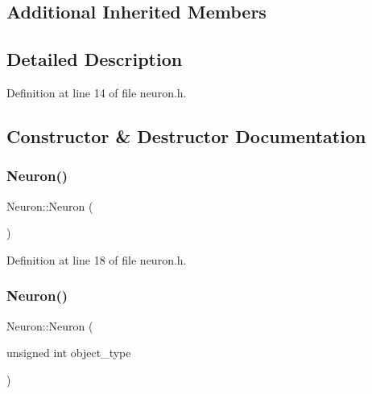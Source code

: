 \subsection*{Additional Inherited Members}


\subsection{Detailed Description}


Definition at line 14 of file neuron.\+h.



\subsection{Constructor \& Destructor Documentation}
\mbox{\label{class_neuron_a823487d01615fadb8ac19a2768dd9d96}} 
\subsubsection{\texorpdfstring{Neuron()}{Neuron()}\hspace{0.1cm}{\footnotesize\ttfamily [1/4]}}
{\footnotesize\ttfamily Neuron\+::\+Neuron (\begin{DoxyParamCaption}{ }\end{DoxyParamCaption})\hspace{0.3cm}{\ttfamily [inline]}}



Definition at line 18 of file neuron.\+h.

\mbox{\label{class_neuron_acbc433cac4f27aa7f4e05be26c336aa5}} 
\subsubsection{\texorpdfstring{Neuron()}{Neuron()}\hspace{0.1cm}{\footnotesize\ttfamily [2/4]}}
{\footnotesize\ttfamily Neuron\+::\+Neuron (\begin{DoxyParamCaption}\item[{unsigned int}]{object\+\_\+type }\end{DoxyParamCaption})\hspace{0.3cm}{\ttfamily [inline]}}



